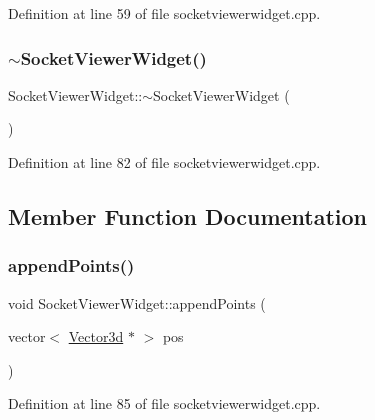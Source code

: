 Definition at line 59 of file socketviewerwidget.\+cpp.

\mbox{\label{class_socket_viewer_widget_a2a2c1bca1ef3d79fe1a32daa8b231ea9}} 
\subsubsection{\texorpdfstring{$\sim$SocketViewerWidget()}{~SocketViewerWidget()}}
{\footnotesize\ttfamily Socket\+Viewer\+Widget\+::$\sim$\+Socket\+Viewer\+Widget (\begin{DoxyParamCaption}{ }\end{DoxyParamCaption})}



Definition at line 82 of file socketviewerwidget.\+cpp.



\subsection{Member Function Documentation}
\mbox{\label{class_socket_viewer_widget_aeb7871e57bbde86b284978e7129273dd}} 
\subsubsection{\texorpdfstring{appendPoints()}{appendPoints()}}
{\footnotesize\ttfamily void Socket\+Viewer\+Widget\+::append\+Points (\begin{DoxyParamCaption}\item[{vector$<$ \mbox{\hyperlink{struct_vector3d}{Vector3d}} $\ast$ $>$}]{pos }\end{DoxyParamCaption})}



Definition at line 85 of file socketviewerwidget.\+cpp.

\mbox{\label{class_socket_viewer_widget_a8177bb48e4f28bb3ef0ba9861502e58f}} 

